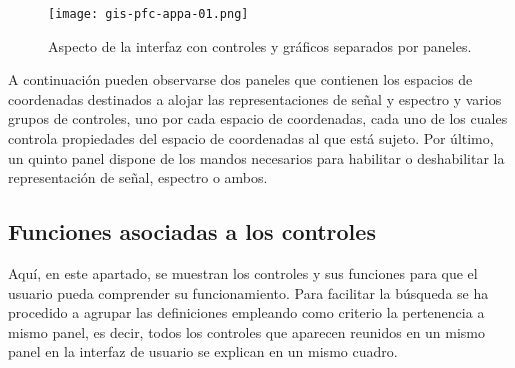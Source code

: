 \begin{figure}
	\begin{center}
		\texttt{[image: gis-pfc-appa-01.png]}
	\end{center}
	\caption[Aspecto de la interfaz de usuario]{Aspecto de la interfaz
	con controles y gráficos separados por paneles.}
	\label{fig:interface}
\end{figure}

A continuación pueden observarse dos paneles que contienen los espacios de
coordenadas destinados a alojar las representaciones de señal y espectro y
varios grupos de controles, uno por cada espacio de coordenadas, cada uno
de los cuales controla propiedades del espacio de coordenadas al que está
sujeto. Por último, un quinto panel dispone de los mandos necesarios para
habilitar o deshabilitar la representación de señal, espectro o ambos.


\subsection{Funciones asociadas a los controles}

Aquí, en este apartado, se muestran los controles y sus funciones para que
el usuario pueda comprender su funcionamiento. Para facilitar la búsqueda
se ha procedido a agrupar las definiciones empleando como criterio la
pertenencia a mismo panel, es decir, todos los controles que aparecen
reunidos en un mismo panel en la interfaz de usuario se explican en un
mismo cuadro.

